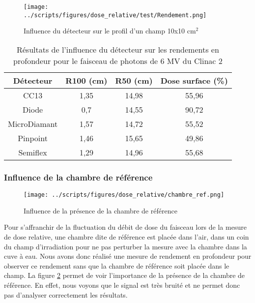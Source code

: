 \documentclass{article}
\begin{document}
\begin{figure}[h]
  \centering
  \texttt{[image: ../scripts/figures/dose\_relative/test/Rendement.png]}
  \caption{Influence du détecteur sur le profil d'un champ 10x10 cm$^2$}
  \label{fig_rdt_detecteurs}
\end{figure}

\begin{table}[h]
  \centering
  \begin{tabular}{cccc}
    \toprule
    \textbf{Détecteur} & \textbf{R100 (cm)} & \textbf{R50 (cm)} & \textbf{Dose surface (\%)} \\
    \toprule
    CC13 & 1,35 & 14,98 & 55,96 \\
    Diode & 0,7 & 14,55 & 90,72 \\
    MicroDiamant & 1,57 & 14,72 & 55,52 \\
    Pinpoint & 1,46 & 15,65 & 49,86 \\
    Semiflex & 1,29 & 14,96 & 55,68 \\
    \bottomrule
  \end{tabular}
  \caption{Résultats de l'influence du détecteur sur les rendements en profondeur pour le faisceau de photons de 6 MV du Clinac 2}
  \label{table_rdt_detecteurs}
\end{table}

\newpage
\subsubsection{Influence de la chambre de référence}

\begin{figure}[h!]
  \centering
  \texttt{[image: ../scripts/figures/dose\_relative/chambre\_ref.png]}
  \caption{Influence de la présence de la chambre de référence}
  \label{fig_sanss_chambre_ref}
\end{figure}

Pour s'affranchir de la fluctuation du débit de dose du faisceau lors de la mesure de dose relative, une chambre dite de référence est placée dans l'air, dans un coin du champ d'irradiation pour ne pas perturber la mesure avec la chambre dans la cuve à eau. Nous avons donc réalisé une mesure de rendement en profondeur pour observer ce rendement sans que la chambre de référence soit placée dans le champ. La figure \ref*{fig_sanss_chambre_ref} permet de voir l'importance de la présence de la chambre de référence. En effet, nous voyons que le signal est très bruité et ne permet donc pas d'analyser correctement les résultats.
\end{document}
